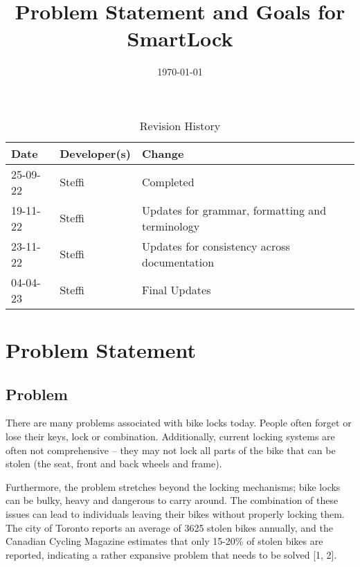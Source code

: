 \documentclass{article}
\title{Problem Statement and Goals for SmartLock\\\progname}
\author{\authname}
\date{\today}
\begin{document}




\maketitle
\thispagestyle{empty}

\newpage
{}
\begin{table}[hp]
\caption{Revision History} \label{TblRevisionHistory}
\begin{tabularx}{\textwidth}{llX}
\toprule
\textbf{Date} & \textbf{Developer(s)} & \textbf{Change}\\
\midrule
25-09-22 & Steffi & Completed\\
19-11-22 & Steffi & Updates for grammar, formatting and terminology\\
23-11-22 & Steffi & Updates for consistency across documentation\\
04-04-23 & Steffi & Final Updates\\
\bottomrule
\end{tabularx}
\end{table}

\newpage
\tableofcontents
\listoftables

\newpage
{}
\section{Problem Statement}

\subsection{Problem}

There are many problems associated with bike locks today.  People often forget or lose their keys, lock or combination.  Additionally, current locking systems are often not comprehensive – they may not lock all parts of the bike that can be stolen (the seat, front and back wheels and frame). 

Furthermore, the problem stretches beyond the locking mechanisms; bike locks can be bulky, heavy and dangerous to carry around.  The combination of these issues can lead to individuals leaving their bikes without properly locking them.  The city of Toronto reports an average of 3625 stolen bikes annually, and the Canadian Cycling Magazine estimates that only 15-20\% of stolen bikes are reported, indicating a rather expansive problem that needs to be solved [1, 2]. 
\end{document}
